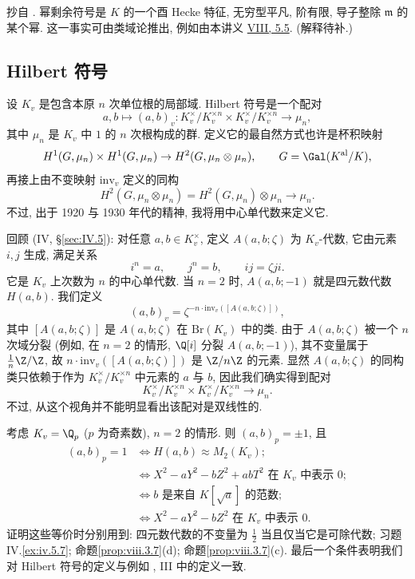 \begin{NOTES}
抄自 . 幂剩余符号是 $K$ 的一个酉 Hecke 特征, 无穷型平凡, 阶有限, 导子整除 $\mathfrak{m}$ 的某个幂. 这一事实可由类域论推出, 例如由本讲义 \hyperlink{item:viii.5.5}{VIII, 5.5}. (解释待补.)
\end{NOTES}

\subsection*{Hilbert 符号}

设 $K_v$ 是包含本原 $n$ 次单位根的局部域. Hilbert 符号是一个配对
\[
a,b\mapsto(a,b)_{v}:K_{v}^{\times}/K_{v}^{\times n}\times K_{v}^{\times}/K_{v}^{\times n}\to\mu_{n},
\]
其中 $\mu_{n}$ 是 $K_{v}$ 中 $1$ 的 $n$ 次根构成的群. 定义它的最自然方式也许是杯积映射
\[
H^{1}(G,\mu_{n})\times H^{1}(G,\mu_{n})\to H^{2}(G,\mu_{n}\otimes\mu_{n}),\qquad G=\Gal(K^{\mathrm{al}}/K),
\]
再接上由不变映射 $\mathrm{inv}_v$ 定义的同构
\[
H^{2}(G,\mu_{n}\otimes\mu_{n})=H^{2}(G,\mu_{n})\otimes\mu_{n}\to\mu_{n}.
\]
不过, 出于 1920 与 1930 年代的精神, 我将用中心单代数来定义它.

回顾 (IV, \S \ref{sec:IV.5}): 对任意 $a,b\in K_v^{\times}$, 定义 $A(a,b;\zeta)$ 为 $K_v$-代数, 它由元素 $i,j$ 生成, 满足关系
\[
i^{n}=a,\qquad j^{n}=b,\qquad ij=\zeta ji.
\]
它是 $K_v$ 上次数为 $n$ 的中心单代数. 当 $n=2$ 时, $A(a,b;-1)$ 就是四元数代数 $H(a,b)$. 我们定义
\[
(a,b)_{v}=\zeta^{-n\cdot\mathrm{inv}_{v}([A(a,b;\zeta)])},
\]
其中 $[A(a,b;\zeta)]$ 是 $A(a,b;\zeta)$ 在 $\mathrm{Br}(K_v)$ 中的类. 由于 $A(a,b;\zeta)$ 被一个 $n$ 次域分裂 (例如, 在 $n=2$ 的情形, $\Q[i]$ 分裂 $A(a,b;-1)$), 其不变量属于 $\frac{1}{n}\Z/\Z$, 故 $n\cdot\mathrm{inv}_v([A(a,b;\zeta)])$ 是 $\Z/n\Z$ 的元素. 显然 $A(a,b;\zeta)$ 的同构类只依赖于作为 $K_v^{\times}/K_v^{\times n}$ 中元素的 $a$ 与 $b$, 因此我们确实得到配对
\[
K_{v}^{\times}/K_{v}^{\times n}\times K_{v}^{\times}/K_{v}^{\times n}\to\mu_{n}.
\]
不过, 从这个视角并不能明显看出该配对是双线性的.

\setcounter{theorem}{5}
\begin{example}\label{ex:viii.5.6}
考虑 $K_v=\Q_p$ ($p$ 为奇素数), $n=2$ 的情形. 则 $(a,b)_p=\pm 1$, 且
\[
\begin{aligned}
(a,b)_{p}=1&\iff H(a,b)\approx M_{2}(K_{v});\\
&\iff X^{2}-aY^{2}-bZ^{2}+abT^{2} \text{ 在 } K_{v} \text{ 中表示 } 0;\\
&\iff b \text{ 是来自 } K[\sqrt{a}] \text{ 的范数};\\
&\iff X^{2}-aY^{2}-bZ^{2} \text{ 在 } K_{v} \text{ 中表示 } 0.
\end{aligned}
\]
证明这些等价时分别用到: 四元数代数的不变量为 $\frac{1}{2}$ 当且仅当它是可除代数; 习题 IV.\ref{ex:iv.5.7}; 命题\ref{prop:viii.3.7}(d); 命题\ref{prop:viii.3.7}(c). 最后一个条件表明我们对 Hilbert 符号的定义与例如 \cite{Serre1970}, III 中的定义一致.
\end{example}

